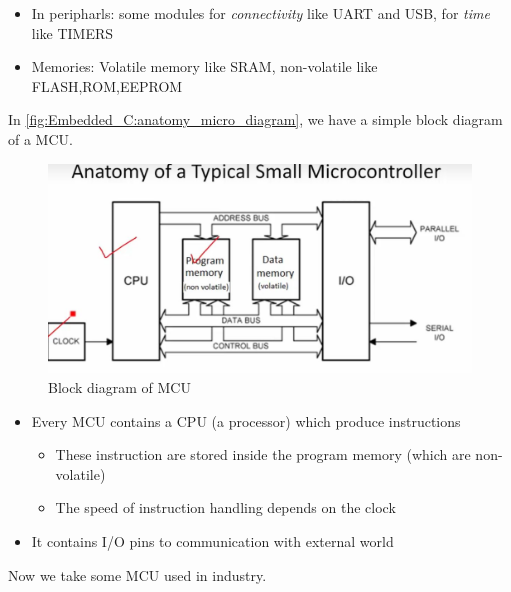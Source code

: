 \begin{itemize}
    \item In peripharls: some modules for \textit{connectivity} like UART and USB, for \textit{time} like TIMERS
    
    \item Memories: Volatile memory like SRAM, non-volatile like FLASH,ROM,EEPROM
\end{itemize}


\newpage
In \autoref{fig:Embedded_C:anatomy_micro_diagram}, we have a simple block diagram of a MCU.

\begin{figure}[h]
\centering
\includegraphics[scale=0.5]{Figures/Embedded_C/anatomy_micro_diagram}
\caption{Block diagram of MCU}
\label{fig:Embedded_C:anatomy_micro_diagram}
\end{figure} 

\begin{itemize}
    \item Every MCU contains a CPU (a processor) which produce instructions
    
    \begin{itemize}
        \item These instruction are stored inside the program memory (which are non-volatile)
        
        
        \item The speed of instruction handling depends on the clock
        
    \end{itemize}
    
    \item It contains I/O pins to communication with external world
    
\end{itemize}

Now we take some MCU used in industry.

